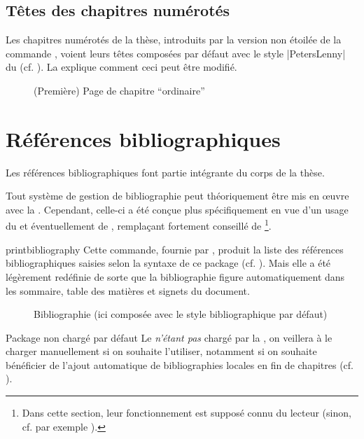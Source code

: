 \subsection{Têtes des chapitres numérotés}
\label{sec-chapitres-numerotes}%
%

Les chapitres numérotés de la thèse, introduits par la version non étoilée de la
commande , voient leurs têtes composées par défaut avec
le style |PetersLenny| du  (cf. ). La
 explique comment ceci peut être modifié.

\begin{figure}[ht]
  \centering
  \caption[Chapitre \enquote{ordinaire}]{(Première) Page de chapitre
    \enquote{ordinaire}}
  \label{fig-chapitre}
\end{figure}

\section{Références bibliographiques}\label{sec-refer-bibl}
%

Les références bibliographiques font partie intégrante du corps de la thèse.

Tout système de gestion de bibliographie peut théoriquement être mis en œuvre
avec la \yatCl{}. Cependant, celle-ci a été conçue plus spécifiquement en vue
d'un usage du  et éventuellement de ,
remplaçant fortement conseillé de \footnote{Dans cette section,
  leur fonctionnement est supposé connu du lecteur (sinon, cf. par exemple
  \cite{en-ligne6}).}.

\begin{docCommand}[doc description=\mandatory]{printbibliography}{}
  Cette commande, fournie par , produit la liste des
  références bibliographiques saisies selon la syntaxe de ce package (cf.
  ). Mais elle a été légèrement redéfinie de sorte
  que la bibliographie figure automatiquement dans les sommaire, table des
  matières et signets du document.
\end{docCommand}

\begin{figure}[htbp]
  \centering
  \caption[Bibliographie]{Bibliographie (ici composée avec le style
    bibliographique par défaut)}
  \label{fig-printbibliography}
\end{figure}

\begin{dbwarning}{Package  non chargé par défaut}{}
  Le  \emph{n'étant pas} chargé par la \yatCl{}, on veillera
  à le charger manuellement si on souhaite l'utiliser, notamment si on souhaite
  bénéficier de l'ajout automatique de bibliographies locales en fin de
  chapitres (cf. ).
\end{dbwarning}

